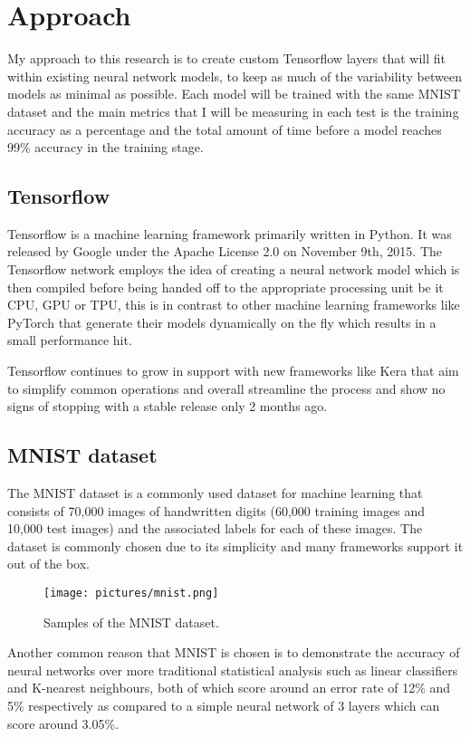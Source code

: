 \documentclass[a4paper,oneside,phd,etd]{BYUPhys}
\begin{document}
\section{Approach}
My approach to this research is to create custom Tensorflow layers that will fit within existing neural network models, to keep as much of the variability between models as minimal as possible. Each model will be trained with the same MNIST dataset and the main metrics that I will be measuring in each test is the training accuracy as a percentage and the total amount of time before a model reaches 99\% accuracy in the training stage.

\subsection{Tensorflow}
Tensorflow\cite{tensorflow} is a machine learning framework primarily written in Python. It was released by Google under the Apache License 2.0 on November 9th, 2015. The Tensorflow network employs the idea of creating a neural network model which is then compiled before being handed off to the appropriate processing unit be it CPU, GPU or TPU, this is in contrast to other machine learning frameworks like PyTorch that generate their models dynamically on the fly which results in a small performance hit.

Tensorflow continues to grow in support with new frameworks like Kera that aim to simplify common operations and overall streamline the process and show no signs of stopping with a stable release only 2 months ago.

\subsection{MNIST dataset}
The MNIST dataset\cite{lecun-website} is a commonly used dataset for machine learning that consists of 70,000 images of handwritten digits (60,000 training images and 10,000 test images) and the associated labels for each of these images. The dataset is commonly chosen due to its simplicity and many frameworks support it out of the box.
\begin{figure}[H]
\centering
\texttt{[image: pictures/mnist.png]}
\caption{Samples of the MNIST dataset\cite{fig:mnist}.}
\label{fig:mnist}
\end{figure}

Another common reason that MNIST is chosen is to demonstrate the accuracy of neural networks over more traditional statistical analysis such as linear classifiers and K-nearest neighbours, both of which score around an error rate of 12\% and 5\% respectively\cite{lecun-98} as compared to a simple neural network of 3 layers which can score around 3.05\%\cite{lecun-98}.
\end{document}
